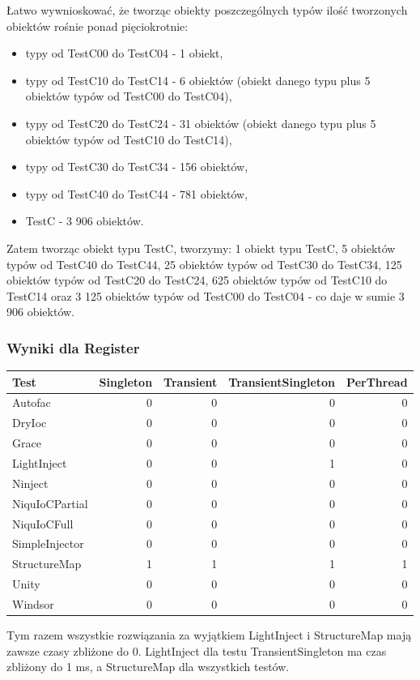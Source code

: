 \documentclass[12pt]{article}
\begin{document}
Łatwo wywnioskować, że tworząc obiekty poszczególnych typów ilość tworzonych obiektów rośnie ponad pięciokrotnie:
\begin{itemize}
	\item typy od TestC00 do TestC04 - 1 obiekt,
	\item typy od TestC10 do TestC14 - 6 obiektów (obiekt danego typu plus 5 obiektów typów od TestC00 do TestC04),
	\item typy od TestC20 do TestC24 - 31 obiektów (obiekt danego typu plus 5 obiektów typów od TestC10 do TestC14),
	\item typy od TestC30 do TestC34 - 156 obiektów,
	\item  typy od TestC40 do TestC44 - 781 obiektów,
	\item TestC - 3 906 obiektów.
\end{itemize}
Zatem tworząc obiekt typu TestC, tworzymy: 1 obiekt typu TestC, 5 obiektów typów od TestC40 do TestC44, 25 obiektów typów od TestC30 do TestC34, 125 obiektów typów od TestC20 do TestC24, 625 obiektów typów od TestC10 do TestC14 oraz 3 125 obiektów typów od TestC00 do TestC04 - co daje w sumie 3 906 obiektów.

\subsubsection{Wyniki dla Register}
\begin{center}
\begin{small}
	\begin{tabular}{ | l | r | r | r | r | }
    		\hline
Test & Singleton & Transient & TransientSingleton & PerThread \\ \hline
Autofac & 0 & 0 & 0 & 0 \\ \hline
DryIoc & 0 & 0 & 0 & 0 \\ \hline
Grace & 0 & 0 & 0 & 0 \\ \hline
LightInject & 0 & 0 & 1 & 0 \\ \hline
Ninject & 0 & 0 & 0 & 0 \\ \hline
NiquIoCPartial & 0 & 0 & 0 & 0 \\ \hline
NiquIoCFull & 0 & 0 & 0 & 0 \\ \hline
SimpleInjector & 0 & 0 & 0 & 0 \\ \hline
StructureMap & 1 & 1 & 1 & 1 \\ \hline
Unity & 0 & 0 & 0 & 0 \\ \hline
Windsor & 0 & 0 & 0 & 0 \\ \hline
  	\end{tabular}
\end{small}
\end{center}
Tym razem wszystkie rozwiązania za wyjątkiem LightInject i StructureMap mają zawsze czasy zbliżone do 0. LightInject dla testu TransientSingleton ma czas zbliżony do 1 ms, a StructureMap dla wszystkich testów.
\end{document}
